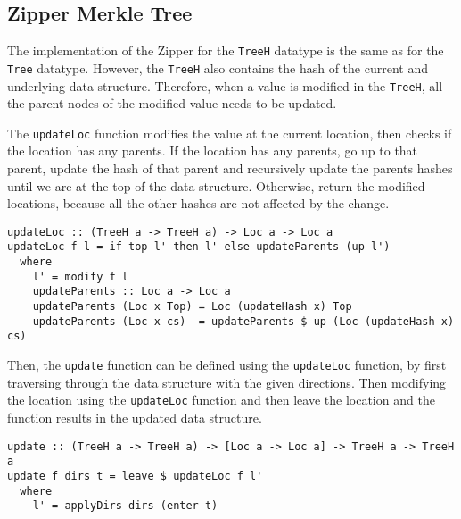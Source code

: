 \subsection{Zipper Merkle Tree}
\label{subsec-zipper-treeh}

The implementation of the Zipper for the \texttt{TreeH} datatype is the same as for the \texttt{Tree} datatype. However, the \texttt{TreeH} also contains the hash of the current and underlying data structure. Therefore, when a value is modified in the \texttt{TreeH}, all the parent nodes of the modified value needs to be updated. 

The \texttt{updateLoc} function modifies the value at the current location, then checks if the location has any parents. If the location has any parents, go up to that parent, update the hash of that parent and recursively update the parents hashes until we are at the top of the data structure. Otherwise, return the modified locations, because all the other hashes are not affected by the change. 

\begin{verbatim}
updateLoc :: (TreeH a -> TreeH a) -> Loc a -> Loc a
updateLoc f l = if top l' then l' else updateParents (up l')
  where
    l' = modify f l
    updateParents :: Loc a -> Loc a
    updateParents (Loc x Top) = Loc (updateHash x) Top
    updateParents (Loc x cs)  = updateParents $ up (Loc (updateHash x) cs)
\end{verbatim}

Then, the \texttt{update} function can be defined using the \texttt{updateLoc} function, by first traversing through the data structure with the given directions. Then modifying the location using the \texttt{updateLoc} function and then leave the location and the function results in the updated data structure.

\begin{verbatim}
update :: (TreeH a -> TreeH a) -> [Loc a -> Loc a] -> TreeH a -> TreeH a 
update f dirs t = leave $ updateLoc f l'
  where
    l' = applyDirs dirs (enter t)
\end{verbatim}